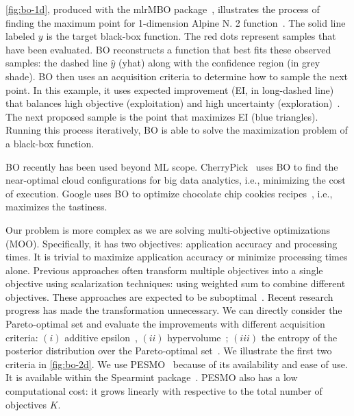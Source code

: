 \autoref{fig:bo-1d}, produced with the mlrMBO package~\cite{bischl2017mlrmbo},
illustrates the process of finding the maximum point for 1-dimension Alpine N. 2
function~\cite{clerc1999swarm}. The solid line labeled $y$ is the target
black-box function. The red dots represent samples that have been evaluated. BO
reconstructs a function that best fits these observed samples: the dashed line
$\hat{y}$ (yhat) along with the confidence region (in grey shade).  BO then uses
an acquisition criteria to determine how to sample the next point.  In this
example, it uses expected improvement (EI, in long-dashed line) that balances
high objective (exploitation) and high uncertainty
(exploration)~\cite{shahriari2016taking}. The next proposed sample is the point
that maximizes EI (blue triangles). Running this process iteratively, BO is able
to solve the maximization problem of a black-box function.


BO recently has been used beyond ML scope.
CherryPick~\cite{alipourfard2017cherrypick} uses BO to find the near-optimal
cloud configurations for big data analytics, i.e., minimizing the cost of
execution. Google uses BO to optimize chocolate chip cookies
recipes~\cite{solnik2017bayesian}, i.e., maximizes the tastiness.

Our problem is more complex as we are solving multi-objective optimizations
(MOO). Specifically, it has two objectives: application accuracy and processing
times. It is trivial to maximize application accuracy or minimize processing
times alone. Previous approaches often transform multiple objectives into a
single objective using scalarization techniques: using weighted sum to combine
different objectives. These approaches are expected to be
suboptimal~\cite{knowles2006parego}. Recent research progress has made the
transformation unnecessary. We can directly consider the Pareto-optimal set and
evaluate the improvements with different acquisition criteria: $(i)$ additive
epsilon~\cite{binoisgpareto}, $(ii)$ hypervolume~\cite{binoisgpareto}; $(iii)$
the entropy of the posterior distribution over the Pareto-optimal
set~\cite{hernandez2016predictive}. We illustrate the first two criteria in
\autoref{fig:bo-2d}. We use PESMO~\cite{hernandez2016predictive} because of its
availability and ease of use. It is available within the Spearmint
package~\cite{snoek2016spearmint}.  PESMO also has a low computational cost: it
grows linearly with respective to the total number of objectives $K$.



